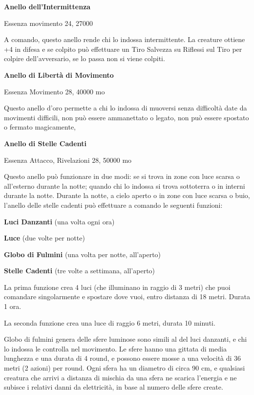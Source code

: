 \documentclass[a4paper,11pt,twoside,openany]{book}
\begin{document}
{\textbf{Anello dell'Intermittenza}

Essenza movimento 24, 27000

A comando, questo anello rende chi lo indossa intermittente. La creature ottiene +4 in difesa e se colpito può effettuare un Tiro Salvezza su Riflessi sul Tiro per colpire dell'avversario, se lo passa non si viene colpiti.

\textbf{Anello di Libertà di Movimento}

Essenza Movimento 28, 40000 mo

Questo anello d'oro permette a chi lo indossa di muoversi senza difficoltà date da movimenti difficili, non può essere ammanettato o legato, non può essere spostato o fermato magicamente,

\textbf{Anello di Stelle Cadenti}

Essenza Attacco, Rivelazioni 28, 50000 mo

Questo anello può funzionare in due modi: se si trova in zone con luce scarsa o all'esterno durante la notte; quando chi lo indossa si trova sottoterra o in interni durante la notte. Durante la notte, a cielo aperto o in zone con luce scarsa o buio, l'anello delle stelle cadenti può effettuare a comando le seguenti funzioni:

\textbf{Luci Danzanti} (una volta ogni ora)

\textbf{Luce} (due volte per notte)

\textbf{Globo di Fulmini} (una volta per notte, all'aperto)

\textbf{Stelle Cadenti} (tre volte a settimana, all'aperto)

La prima funzione crea 4 luci (che illuminano in raggio di 3 metri) che puoi comandare singolarmente e spostare dove vuoi, entro distanza di 18 metri. Durata 1 ora.

La seconda funzione crea una luce di raggio 6 metri, durata 10 minuti.

Globo di fulmini genera delle sfere luminose sono simili al del luci danzanti, e chi lo indossa le controlla nel movimento. Le sfere hanno una gittata di media lunghezza e una durata di 4 round, e possono essere mosse a una velocità di 36 metri (2 azioni) per round. Ogni sfera ha un diametro di circa 90 cm, e qualsiasi creatura che arrivi a distanza di mischia da una sfera ne scarica l'energia e ne subisce i relativi danni da elettricità, in base al numero delle sfere create.

}
\end{document}
